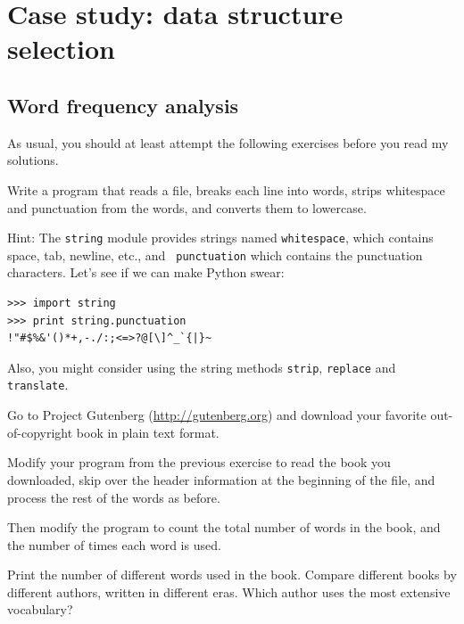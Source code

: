\documentclass[10pt]{book}
\begin{document}




\chapter{Case study: data structure selection}

\section{Word frequency analysis}
\label{analysis}

As usual, you should at least attempt the following exercises
before you read my solutions.

\begin{exercise}

Write a program that reads a file, breaks each line into
words, strips whitespace and punctuation from the words, and
converts them to lowercase.

Hint: The {\tt string} module provides strings named {\tt whitespace},
which contains space, tab, newline, etc., and {\tt
  punctuation} which contains the punctuation characters.  Let's see
if we can make Python swear:

\begin{verbatim}
>>> import string
>>> print string.punctuation
!"#$%&'()*+,-./:;<=>?@[\]^_`{|}~
\end{verbatim}
%
Also, you might consider using the string methods {\tt strip},
{\tt replace} and {\tt translate}.

\end{exercise}


\begin{exercise}

Go to Project Gutenberg (\url{http://gutenberg.org}) and download 
your favorite out-of-copyright book in plain text format.

Modify your program from the previous exercise to read the book
you downloaded, skip over the header information at the beginning
of the file, and process the rest of the words as before.

Then modify the program to count the total number of words in
the book, and the number of times each word is used.

Print the number of different words used in the book.  Compare
different books by different authors, written in different eras.
Which author uses the most extensive vocabulary?
\end{exercise}
\end{document}
